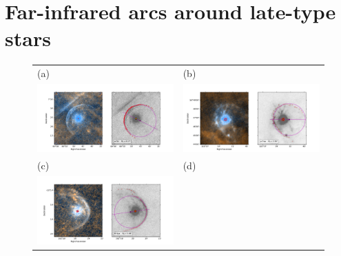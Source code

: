 \section{Far-infrared arcs around late-type stars}
\label{sec:far-infrared-arcs}


\begin{figure}
  \setlength\tabcolsep{0pt}
  \begin{tabular}{ll}
    (a) & (b) \\
    \includegraphics[trim=10 0 65 20, clip]{figs/alphaori-imageplot}
    & \includegraphics[trim=10 0 65 20, clip]{figs/mucep-imageplot}\\
    (c) & (d) \\
    \includegraphics[trim=10 0 65 20, clip]{figs/rhya-imageplot}

\end{tabular}
\end{figure}
